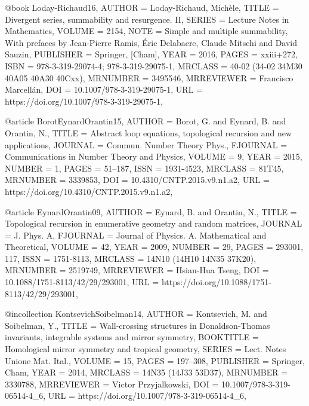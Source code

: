 @book {Loday-Richaud16,
    AUTHOR = {Loday-Richaud, Mich\`ele},
     TITLE = {Divergent series, summability and resurgence. {II}},
    SERIES = {Lecture Notes in Mathematics},
    VOLUME = {2154},
      NOTE = {Simple and multiple summability,
              With prefaces by Jean-Pierre Ramis, \'{E}ric Delabaere, Claude
              Mitschi and David Sauzin},
 PUBLISHER = {Springer, [Cham]},
      YEAR = {2016},
     PAGES = {xxiii+272},
      ISBN = {978-3-319-29074-4; 978-3-319-29075-1},
   MRCLASS = {40-02 (34-02 34M30 40A05 40A30 40Cxx)},
  MRNUMBER = {3495546},
MRREVIEWER = {Francisco Marcell\'{a}n},
       DOI = {10.1007/978-3-319-29075-1},
       URL = {https://doi.org/10.1007/978-3-319-29075-1},
}

@article {BorotEynardOrantin15,
    AUTHOR = {Borot, G. and Eynard, B. and Orantin, N.},
     TITLE = {Abstract loop equations, topological recursion and new
              applications},
   JOURNAL = {Commun. Number Theory Phys.},
  FJOURNAL = {Communications in Number Theory and Physics},
    VOLUME = {9},
      YEAR = {2015},
    NUMBER = {1},
     PAGES = {51--187},
      ISSN = {1931-4523},
   MRCLASS = {81T45},
  MRNUMBER = {3339853},
       DOI = {10.4310/CNTP.2015.v9.n1.a2},
       URL = {https://doi.org/10.4310/CNTP.2015.v9.n1.a2},
}

@article {EynardOrantin09,
    AUTHOR = {Eynard, B. and Orantin, N.},
     TITLE = {Topological recursion in enumerative geometry and random
              matrices},
   JOURNAL = {J. Phys. A},
  FJOURNAL = {Journal of Physics. A. Mathematical and Theoretical},
    VOLUME = {42},
      YEAR = {2009},
    NUMBER = {29},
     PAGES = {293001, 117},
      ISSN = {1751-8113},
   MRCLASS = {14N10 (14H10 14N35 37K20)},
  MRNUMBER = {2519749},
MRREVIEWER = {Hsian-Hua Tseng},
       DOI = {10.1088/1751-8113/42/29/293001},
       URL = {https://doi.org/10.1088/1751-8113/42/29/293001},
}

@incollection {KontsevichSoibelman14,
    AUTHOR = {Kontsevich, M. and Soibelman, Y.},
     TITLE = {Wall-crossing structures in {D}onaldson-{T}homas invariants,
              integrable systems and mirror symmetry},
 BOOKTITLE = {Homological mirror symmetry and tropical geometry},
    SERIES = {Lect. Notes Unione Mat. Ital.},
    VOLUME = {15},
     PAGES = {197--308},
 PUBLISHER = {Springer, Cham},
      YEAR = {2014},
   MRCLASS = {14N35 (14J33 53D37)},
  MRNUMBER = {3330788},
MRREVIEWER = {Victor Przyjalkowski},
       DOI = {10.1007/978-3-319-06514-4_6},
       URL = {https://doi.org/10.1007/978-3-319-06514-4_6},
}


